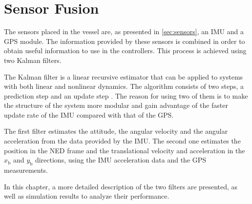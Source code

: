 \chapter{Sensor Fusion}\label{chap:sensorFusion}
The sensors placed in the vessel are, as presented in \autoref{sec:sensors}, an IMU and a GPS module. The information provided by these sensors is combined in order to obtain useful information to use in the controllers. This process is achieved using two Kalman filters. 

The Kalman filter is a linear recursive estimator that can be applied to systems with both linear and nonlinear dynamics. The algorithm consists of two steps, a prediction step and an update step \cite{SHaykin}. The reason for using two of them is to make the structure of the system more modular and gain advantage of the faster update rate of the IMU compared with that of the GPS.

The first filter estimates the attitude, the angular velocity and the angular acceleration from the data provided by the IMU. The second one estimates the position in the NED frame and the translational velocity and acceleration in the $x_\mathrm{b}$ and $y_\mathrm{b}$ directions, using the IMU acceleration data and the GPS measurements.

In this chapter, a more detailed description of the two filters are presented, as well as simulation results to analyze their performance.